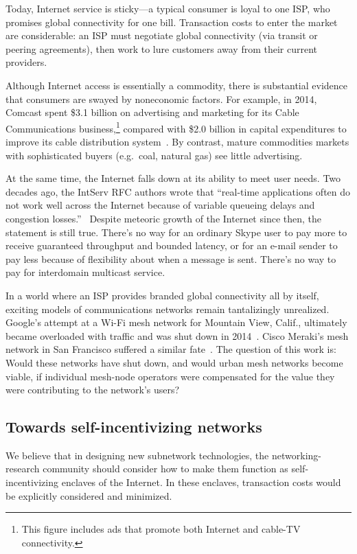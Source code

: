 Today, Internet service is sticky---a typical consumer is loyal to one
ISP, who promises global connectivity for one bill. Transaction costs
to enter the market are considerable: an ISP must negotiate global
connectivity (via transit or peering agreements), then work to lure
customers away from their current providers.

Although Internet access is essentially a commodity, there is
substantial evidence that consumers are swayed by noneconomic
factors. For example, in 2014, Comcast spent \$3.1 billion on advertising and
marketing for its Cable Communications business,\footnote{This figure
  includes ads that promote both Internet and cable-TV connectivity.}
compared with \$2.0 billion in capital expenditures to improve its
cable distribution system~\cite{comcastannualreport}. By contrast,
mature commodities markets with sophisticated buyers (e.g.~coal,
natural gas) see little advertising.

At the same time, the Internet falls down at its ability to meet user
needs. Two decades ago, the IntServ RFC authors wrote that ``real-time
applications often do not work well across the Internet because of
variable queueing delays and congestion losses.''~\cite{rfc1633}
Despite meteoric growth of the Internet since then, the statement is
still true. There's no way for an ordinary Skype user to pay more to receive
guaranteed throughput and bounded latency, or for an e-mail sender to
pay less because of flexibility about when a message is sent. There's no
way to pay for interdomain multicast service.

In a world where an ISP provides branded global connectivity all by
itself, exciting models of communications networks remain
tantalizingly unrealized.  Google's attempt at a Wi-Fi mesh network
for Mountain View, Calif., ultimately became overloaded with traffic
and was shut down in 2014~\cite{pcworld13}. Cisco Meraki's mesh
network in San Francisco suffered a similar fate~\cite{economist14}.
The question of this work is: Would these networks have shut down, and
would urban mesh networks become viable, if individual mesh-node
operators were compensated for the value they were contributing
to the network's users?

\subsection{Towards self-incentivizing networks}

We believe that in designing new subnetwork technologies, the
networking-research community should consider how to make them
function as self-incentivizing enclaves of the Internet. In these
enclaves, transaction costs would be explicitly
considered and minimized.

